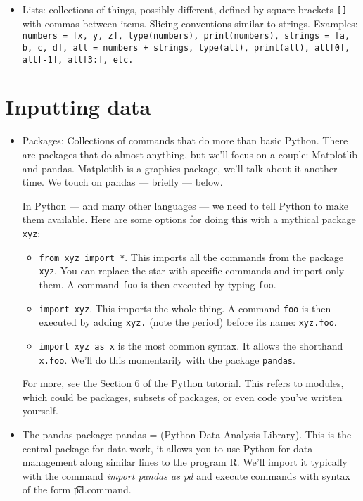 \documentclass[11pt]{article}
\begin{document}
\begin{itemize}
\item Lists: collections of things, possibly different, defined by square brackets
{\tt []} with commas between items.
Slicing conventions similar to strings.
Examples:  {\tt numbers = [x, y, z], type(numbers),
print(numbers),
strings = [a, b, c, d],
all = numbers + strings, type(all),
print(all),
all[0], all[-1], all[3:], etc.}

\end{itemize}


\section{Inputting data}
\begin{itemize}
\item Packages:  Collections of commands that do more than basic Python.
There are packages that do almost anything, but we'll focus on a couple:
Matplotlib and pandas.  Matplotlib is a graphics package, we'll talk about it
another time.
We touch on pandas --- briefly --- below.

In Python --- and many other languages --- we need to tell Python to make them available.
Here are some options for doing this with a mythical package {\tt xyz}:
\begin{itemize}
\item {\tt from xyz import *}.
This imports all the commands from the package {\tt xyz}.
You can replace the star
with specific commands and import only them.
A command {\tt foo} is then executed by typing {\tt foo}.
\item {\tt import xyz}.  This imports the whole thing.
A command {\tt foo} is then executed by adding {\tt xyz.}
(note the period) before its name:  {\tt xyz.foo}.
\item {\tt import xyz as x} is the most common syntax.
It allows the shorthand {\tt x.foo}.
We'll do this momentarily with the package {\tt pandas}.
\end{itemize}
For more, see the
\href{https://docs.python.org/3.4/tutorial/modules.html}{Section 6}
of the Python tutorial.
This refers to modules, which could be packages, subsets of packages, or even
code you've written yourself.

\item The pandas package:  pandas = (Python Data Analysis Library).
This is the central package for data work,
it allows you to use Python for data management along similar
lines to the program R.
We'll import it typically with the command {\it import pandas as pd}
and execute commands with syntax of the form {\t pd.command}.


\end{itemize}
\end{document}

